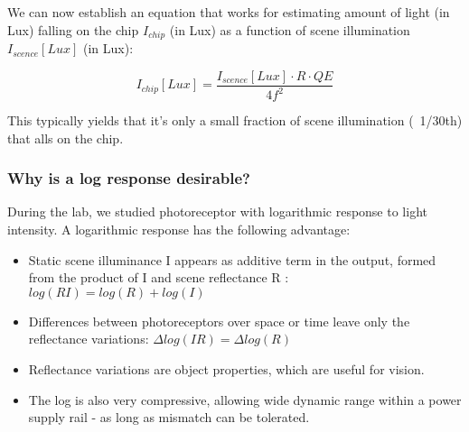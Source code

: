 We can now establish an equation that works for estimating amount of light (in Lux) falling on the chip $I_{chip}$ (in Lux) as a function of scene illumination $I_{scence}[Lux]$ (in Lux):

\begin{equation}
    I_{chip}[Lux] = \frac{I_{scence}[Lux]\cdot R \cdot QE}{4f^2}
\end{equation}

This typically yields that it's only a small fraction of scene illumination (~1/30th) that alls on the chip. 

\subsubsection{Why is a log response desirable?}

During the lab, we studied photoreceptor with logarithmic response to light intensity. A logarithmic response has the following advantage:

\begin{itemize}
    \item Static scene illuminance I appears as additive term in the output, formed from the product of I and scene reflectance R : $log(RI) = log(R) + log(I)$
    \item Differences between photoreceptors over space or time leave only the reflectance variations: $\Delta log(IR) = \Delta log(R)$
    \item Reflectance variations are object properties, which are useful for vision.
    \item The log is also very compressive, allowing wide dynamic range within a power supply rail - as long as mismatch can be tolerated.
\end{itemize}
